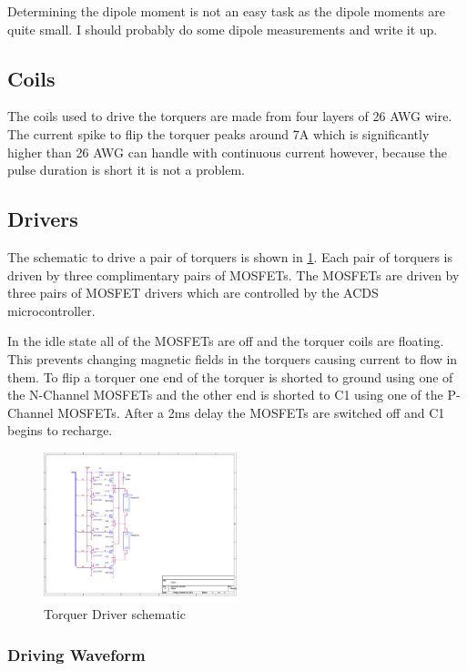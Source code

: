 Determining the dipole moment is not an easy task as the dipole moments are quite small. I should probably do some dipole measurements and write it up.

\subsection{Coils}

The coils used to drive the torquers are made from four layers of 26 AWG wire. The current spike to flip the torquer peaks around 7A which is significantly higher than 26 AWG can handle with continuous current however, because the pulse duration is short it is not a problem.

\subsection{Drivers}

The schematic to drive a pair of torquers is shown in \cref{fig:drive}. Each pair of torquers is driven by three complimentary pairs of \acp{MOSFET}.  The \acp{MOSFET} are driven by three pairs of \ac{MOSFET} drivers which are controlled by the \ac{ACDS} microcontroller.

In the idle state all of the \acp{MOSFET} are off and the torquer coils are floating. This prevents changing magnetic fields in the torquers causing current to flow in them. To flip a torquer one end of the torquer is shorted to ground using one of the N-Channel \acp{MOSFET} and the other end is shorted to C1 using one of the P-Channel \acp{MOSFET}. After a 2ms delay the \acp{MOSFET} are switched off and C1 begins to recharge.

\begin{figure}[H]
    \centering
    \includegraphics[width=0.5\textwidth]{Figures/driverSchematic}
    \caption{Torquer Driver schematic}
    \label{fig:drive}
\end{figure}

\subsubsection{Driving Waveform}

